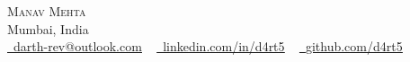 \documentclass[letterpaper,11pt]{article}
\newcommand{\resumeSubHeadingListStart}{\begin{itemize}[leftmargin=0.0in, label={}]}
\newcommand{\resumeSubHeadingListEnd}{\end{itemize}}
\begin{document}

\begin{center}
  {\Huge \scshape Manav Mehta} \\ \vspace{1pt}
  Mumbai, India \\ \vspace{1pt}
  \href{mailto:darth-rev@outlook.com}{\raisebox{-0.2\height}\faEnvelope\  \underline{darth-rev@outlook.com}} ~
  \href{https://linkedin.com/in/d4rt5}{\raisebox{-0.2\height}\faLinkedin\ \underline{linkedin.com/in/d4rt5}}  ~
  \href{https://github.com/d4rt5}{\raisebox{-0.2\height}\faGithub\ \underline{github.com/d4rt5}}
  \vspace{-8pt}
\end{center}

\end{document}
